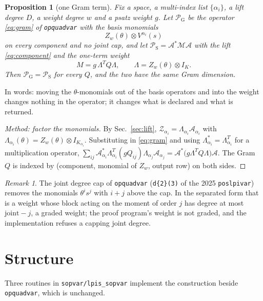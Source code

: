 \documentclass[12pt]{article}
\newcommand{\mcl}[1]{\mathcal{#1}}
\newcommand{\mrm}[1]{\mathrm{#1}}
\newcommand{\code}[1]{\texttt{#1}}
\theoremstyle{plain}
\newtheorem{proposition}[theorem]{Proposition}
\theoremstyle{definition}
\theoremstyle{remark}
\newtheorem*{remark}{Remark}
\begin{document}
\begin{proposition}[one Gram term]\label{prop:equiv}
Fix a space, a multi-index list $\{\alpha_i\}$, a lift degree $D$, a weight degree $w$ and a psatz weight $g$. Let $\mcl P_{\mrm{G}}$ be the operator \eqref{eq:gram} of \code{opquadvar} with the basis monomials
\[
Z_w(\theta)\otimes V^{\alpha_i}(s)
\]
on every component and no joint cap, and let $\mcl P_{\mrm{S}}=\mcl A^*\mcl M\mcl A$ with the lift \eqref{eq:component} and the one-term weight
\[
M=g\,\Lambda^TQ\Lambda,\qquad \Lambda=Z_w(\theta)\otimes I_K.
\]
Then $\mcl P_{\mrm{G}}=\mcl P_{\mrm{S}}$ for every $Q$, and the two have the same Gram dimension.
\end{proposition}
In words: moving the $\theta$-monomials out of the basis operators and into the weight changes nothing in the operator; it changes what is declared and what is returned.

\begin{proof}[Method: factor the monomials]
By Sec.~\ref{sec:lift}, $\mcl Z_{\alpha_i}=\Lambda_{\alpha_i}\mcl A_{\alpha_i}$ with $\Lambda_{\alpha_i}(\theta)=Z_w(\theta)\otimes I_{K_{\alpha_i}}$. Substituting in \eqref{eq:gram} and using $\Lambda_{\alpha_i}^*=\Lambda_{\alpha_i}^T$ for a multiplication operator,
$\sum_{ij}\mcl A_{\alpha_i}^*\Lambda_{\alpha_i}^T(gQ_{ij})\Lambda_{\alpha_j}\mcl A_{\alpha_j}=\mcl A^*\bigl(g\Lambda^TQ\Lambda\bigr)\mcl A$. The Gram $Q$ is indexed by (component, monomial of $Z_w$, output row) on both sides.
\end{proof}

\begin{remark}
The joint degree cap of \code{opquadvar} (\code{d\{2\}(3)} of the 2025 \code{poslpivar}) removes the monomials $\theta^i s^j$ with $i+j$ above the cap. In the separated form that is a weight whose block acting on the moment of order $j$ has degree at most $\mathrm{joint}-j$, a graded weight; the proof program's weight is not graded, and the implementation refuses a capping joint degree.
\end{remark}

\section{Structure}\label{sec:structure}

Three routines in \code{sopvar/lpis\_sopvar} implement the construction beside \code{opquadvar}, which is unchanged.
\end{document}
